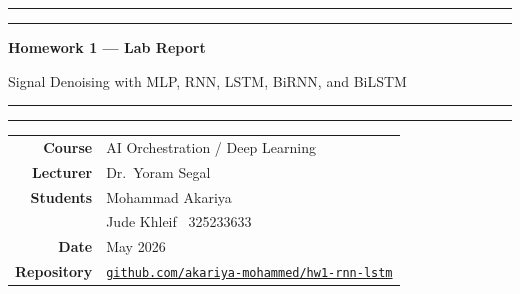 \documentclass[12pt, a4paper]{article}
\begin{document}
\begin{titlepage}
\centering
\vspace*{3cm}

{\color{darkblue}\rule{\linewidth}{1.5pt}}\vspace{0.4em}
{\color{darkblue}\rule{\linewidth}{0.4pt}}

\vspace{1cm}
{\LARGE\bfseries Homework 1 — Lab Report \par}
\vspace{0.4cm}
{\Large Signal Denoising with MLP, RNN, LSTM, BiRNN, and BiLSTM \par}
\vspace{1cm}

{\color{darkblue}\rule{\linewidth}{0.4pt}}\vspace{0.2em}
{\color{darkblue}\rule{\linewidth}{1.5pt}}

\vspace{2.5cm}

\begin{tabular}{rl}
    \textbf{Course}     & AI Orchestration / Deep Learning \\[6pt]
    \textbf{Lecturer}   & Dr.\ Yoram Segal \\[6pt]
    \textbf{Students}   & Mohammad Akariya \quad 211862024 \\[4pt]
                        & Jude Khleif \quad\quad\ 325233633 \\[6pt]
    \textbf{Date}       & May 2026 \\[6pt]
    \textbf{Repository} & \href{https://github.com/akariya-mohammed/hw1-rnn-lstm}
                           {\texttt{github.com/akariya-mohammed/hw1-rnn-lstm}} \\
\end{tabular}

\vfill
\end{titlepage}

\tableofcontents
\newpage

\begin{abstract}
\noindent
This report describes the design, implementation, and comparison of five neural
network architectures on a signal denoising task: a fully-connected MLP,
a vanilla RNN, an LSTM, a bidirectional stacked RNN (BiRNN), and a
bidirectional stacked LSTM (BiLSTM).
Each model receives a 10-sample window of a noisy sine wave together with
a one-hot frequency encoding and is trained to recover the clean signal
using MSE loss, with a learning rate scheduler and gradient clipping.
The final ranking is \textbf{BiLSTM $<$ BiRNN $<$ MLP $<$ LSTM $<$ RNN}
(test MSE: 0.0011, 0.0015, 0.0016, 0.0047, 0.0049).
Adding bidirectional processing and stacked layers reverses the initial
result where the MLP beat the unidirectional recurrent models, confirming
the theoretical prediction that properly designed recurrent architectures
outperform flat networks on time-series data.
\end{abstract}
\end{document}
